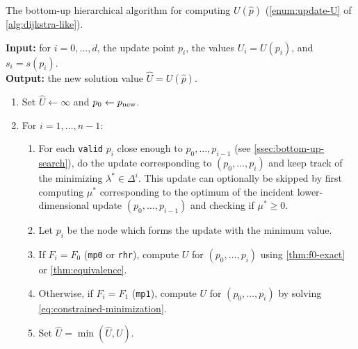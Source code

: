 \documentclass[eikonal.tex]{subfiles}
\begin{document}
\begin{algorithm}[H]
  \caption{The bottom-up hierarchical algorithm for computing
    $U(\hat{p})$ (\cref{enum:update-U} of
    \cref{alg:dijkstra-like}).}\label{alg:bottom-up}
  \textbf{Input:} for $i = 0, \hdots, d$, the update point $p_i$, the
  values
  $U_i = U(p_i)$, and $s_i = s(p_i)$. \\
  \textbf{Output:} the new solution value $\hat{U} = U(\hat{p})$.
  \begin{enumerate}[nolistsep]
  \item Set $\hat{U} \gets \infty$ and $p_0 \gets p_{\operatorname{new}}$.
  \item For $i = 1, \hdots, n - 1$:
    \begin{enumerate}
    \item For each \texttt{valid} $p_i$ close enough to
      $p_0, \hdots, p_{i-1}$ (see \cref{ssec:bottom-up-search}), do
      the update corresponding to $(p_0, \hdots, p_i)$ and keep track
      of the minimizing $\lambda^* \in \Delta^i$. This update can
      optionally be skipped by first computing $\mu^*$ corresponding
      to the optimum of the incident lower-dimensional update
      $(p_0, \hdots, p_{i-1})$ and checking if
      $\mu^* \geq 0$.\label{item:bottom-up-for}
    \item Let $p_i$ be the node which forms the update with the
      minimum value.
    \item If $F_i = F_0$ (\texttt{mp0} or \texttt{rhr}), compute $U$
      for $(p_0, \hdots, p_{i})$ using \cref{thm:f0-exact} or
      \cref{thm:equivalence}.
    \item Otherwise, if $F_i = F_1$ (\texttt{mp1}), compute $U$ for
      $(p_0, \hdots, p_{i})$ by solving
      \cref{eq:constrained-minimization}.
    \item Set $\hat{U} = \min(\hat{U}, U)$.
    \end{enumerate}
  \end{enumerate}
\end{algorithm}
\end{document}
